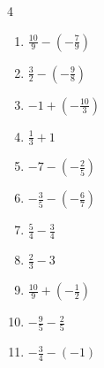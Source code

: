 \begin{multicols}{4}
\begin{enumerate}

  \item $\displaystyle \frac{10}{9} - \left(-\frac{7}{9}\right)$


  \item $\displaystyle \frac{3}{2} - \left(-\frac{9}{8}\right)$


  \item $\displaystyle -1 + \left(-\frac{10}{3}\right)$


  \item $\displaystyle \frac{1}{3} + 1$


  \item $\displaystyle -7 - \left(-\frac{2}{5}\right)$


  \item $\displaystyle -\frac{3}{5} - \left(-\frac{6}{7}\right)$


\columnbreak %

  \item $\displaystyle \frac{5}{4} - \frac{3}{4}$


  \item $\displaystyle \frac{2}{3} - 3$


  \item $\displaystyle \frac{10}{9} + \left(-\frac{1}{2}\right)$


  \item $\displaystyle -\frac{9}{5} - \frac{2}{5}$


  \item $\displaystyle -\frac{3}{4} - \left(-1\right)$



\end{enumerate}
\end{multicols}
